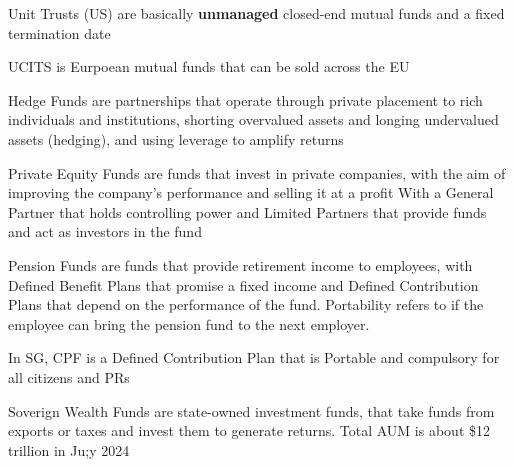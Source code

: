 Unit Trusts (US) are basically \textbf{unmanaged} closed-end mutual funds and a fixed termination date

UCITS is Eurpoean mutual funds that can be sold across the EU

Hedge Funds are partnerships that operate through private placement to rich individuals and institutions, shorting overvalued assets and longing undervalued assets (hedging), and using leverage to amplify returns

Private Equity Funds are funds that invest in private companies, with the aim of improving the company's performance and selling it at a profit
With a General Partner that holds controlling power and Limited Partners that provide funds and act as investors in the fund

Pension Funds are funds that provide retirement income to employees, with Defined Benefit Plans that promise a fixed income and Defined Contribution Plans that depend on the performance of the fund.
Portability refers to if the employee can bring the pension fund to the next employer.
\begin{callout}
    In SG, CPF is a Defined Contribution Plan that is Portable and compulsory for all citizens and PRs
\end{callout}

Soverign Wealth Funds are state-owned investment funds, that take funds from exports or taxes and invest them to generate returns. Total AUM is about \$12 trillion in Ju;y 2024

